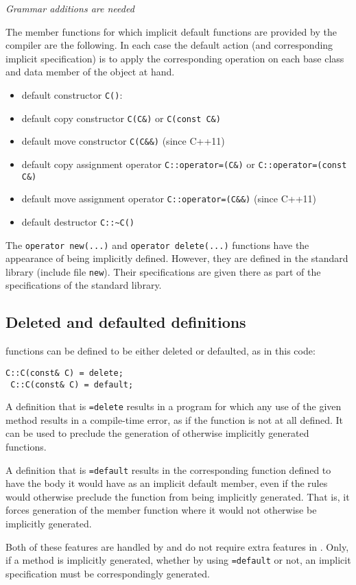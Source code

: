 \emph{Grammar additions are needed}

The member functions for which implicit default functions are provided by the compiler are the following. In each case the default action (and corresponding implicit specification) is to apply the corresponding operation on each base class and data member of the object at hand.
\begin{itemize}
	\item default constructor \lstinline|C()|: 
	\item default copy constructor \lstinline|C(C&)| or \lstinline|C(const C&)|
	\item default move constructor \lstinline|C(C&&)| (since C++11)
	\item default copy assignment operator \lstinline|C::operator=(C&)| or \lstinline|C::operator=(const C&)|
	\item default move assignment operator \lstinline|C::operator=(C&&)| (since C++11)
	\item default destructor \lstinline|C::~C()|
\end{itemize}


The \lstinline|operator new(...)| and 
\lstinline|operator delete(...)| functions have the appearance of being implicitly defined. However, they are defined in the standard library
(include file \lstinline|new|). Their specifications are given there as
part of the specifications of the standard library.

\subsection{Deleted and defaulted definitions}

 \lang{} functions can be defined to be either deleted or defaulted, as in this code:
 \begin{lstlisting}[deletekeywords={default}]
 C::C(const& C) = delete; 
 C::C(const& C) = default; 
 \end{lstlisting}
 A definition that is \lstinline|=delete| results in a program for which any use of the given method results in a compile-time error,
 as if the function is not at all defined. It can be used to preclude the
 generation of otherwise implicitly generated functions.
 
 A definition that is \lstinline|=default| results in the corresponding
 function defined to have the body it would have as an implicit default
 member, even if the \lang{} rules would otherwise preclude the 
 function from being implicitly generated. That is, it forces 
 generation of the member function where it would not otherwise be implicitly generated.
 
Both of these features are handled by \lang{} and do not require 
extra features in \NAME{}. Only, if a method is implicitly generated, whether by using \lstinline|=default| or not, an implicit specification must be correspondingly generated.

